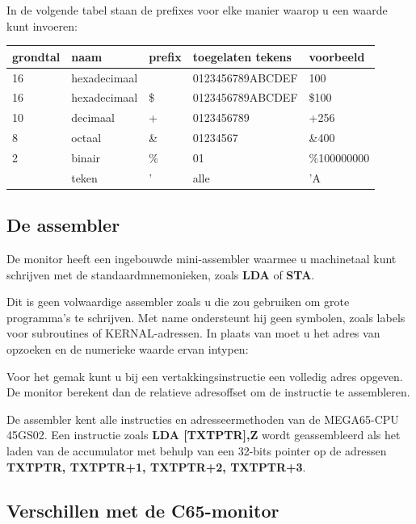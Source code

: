 In de volgende tabel staan de prefixes voor elke manier waarop u een waarde kunt invoeren:

{\ttfamily
{\setlength{\tabcolsep}{1mm}
\begin{center}
\begin{tabular}{|l|l|l|l|l|}
\hline
 grondtal  & naam & prefix & toegelaten tekens & voorbeeld     \\
\hline
16 & hexadecimaal &     & 0123456789ABCDEF &   100       \\16 & hexadecimaal & \$  & 0123456789ABCDEF & \$100       \\10 & decimaal     &  +  & 0123456789       & +256        \\ 8 & octaal       & \&  & 01234567         & \&400       \\ 2 & binair       & \%  & 01               & \%100000000 \\   & teken        &  '  & alle             & 'A          \\
\hline
\end{tabular}
\end{center}
}
}

\subsection{De assembler}

De monitor heeft een ingebouwde mini-assembler waarmee u machinetaal kunt schrijven met de standaardmnemonieken, zoals {\bf LDA} of {\bf STA}.

Dit is geen volwaardige assembler zoals u die zou gebruiken om grote programma's te schrijven. Met name ondersteunt hij geen symbolen, zoals labels voor subroutines of KERNAL-adressen. In plaats van {} moet u het adres van {} opzoeken en de numerieke waarde ervan intypen: {}

Voor het gemak kunt u bij een vertakkingsinstructie een volledig adres opgeven. De monitor berekent dan de relatieve adresoffset om de instructie te assembleren.

De assembler kent alle instructies en adresseermethoden van de MEGA65-CPU 45GS02. Een instructie zoals {\ttfamily \bf LDA [TXTPTR],Z} wordt geassembleerd als het laden van de accumulator met behulp van een 32-bits pointer op de adressen {\ttfamily \bf TXTPTR, TXTPTR+1, TXTPTR+2, TXTPTR+3}.

\subsection{Verschillen met de C65-monitor}

